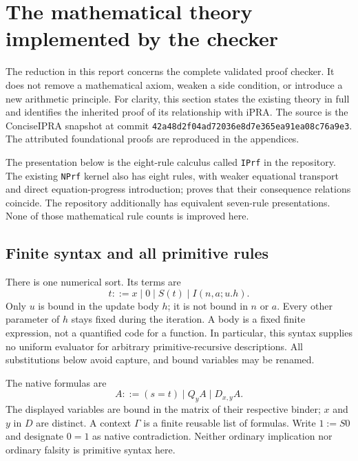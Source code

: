 \documentclass[11pt,letterpaper]{article}
\theoremstyle{definition}
\theoremstyle{remark}
\begin{document}
\section{The mathematical theory implemented by the checker}
\label{sec:unchanged-native-theory}

The reduction in this report concerns the complete validated proof checker.
It does not remove a mathematical axiom, weaken a side condition, or introduce
a new arithmetic principle. For clarity, this section states the existing
theory in full and identifies the inherited proof of its relationship with
iPRA. The source is the ConciseIPRA snapshot at commit
\texttt{42a48d2f04ad72036e8d7e365ea91ea08c76a9e3}.
The attributed foundational proofs are reproduced in the appendices.

The presentation below is the eight-rule calculus called \texttt{IPrf} in
the repository. The existing \texttt{NPrf} kernel also has eight rules, with
weaker equational transport and direct equation-progress introduction;
 proves that their consequence relations coincide.
The repository additionally has equivalent seven-rule presentations.
None of those mathematical rule counts is improved here.

\subsection{Finite syntax and all primitive rules}

There is one numerical sort. Its terms are
\[
 t ::= x\mid 0\mid S(t)\mid I(n,a;u.h).
\]
Only $u$ is bound in the update body $h$; it is not bound in $n$ or $a$.
Every other parameter of $h$ stays fixed during the iteration. A body is a
fixed finite expression, not a quantified code for a function. In particular,
this syntax supplies no uniform evaluator for arbitrary primitive-recursive
descriptions. All substitutions below avoid capture, and bound variables may
be renamed.

The native formulas are
\[
 A ::= (s=t)\mid Q_yA\mid D_{x,y}A.
\]
The displayed variables are bound in the matrix of their respective binder;
$x$ and $y$ in $D$ are distinct. A context $\Gamma$ is a finite reusable list
of formulas. Write $1:=S0$ and designate $0=1$ as native contradiction.
Neither ordinary implication nor ordinary falsity is primitive syntax here.
\end{document}
